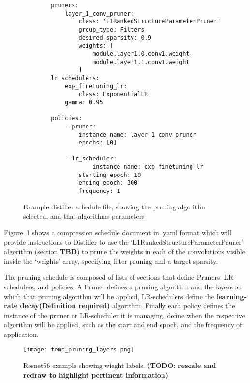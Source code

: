 \documentclass[../Dissertation.tex]{subfiles}
\begin{document}
\singlespacing
\begin{figure}[H]
    \begin{verbatim}
        pruners: 
            layer_1_conv_pruner:
                class: 'L1RankedStructureParameterPruner'
                group_type: Filters
                desired_sparsity: 0.9
                weights: [
                    module.layer1.0.conv1.weight,
                    module.layer1.1.conv1.weight
                ]
        lr_schedulers:
            exp_finetuning_lr:
                class: ExponentialLR
            gamma: 0.95

        policies:
            - pruner:
                instance_name: layer_1_conv_pruner
                epochs: [0]
            
            - lr_scheduler:
                    instance_name: exp_finetuning_lr
                starting_epoch: 10
                ending_epoch: 300
                frequency: 1
    \end{verbatim}
    \caption{Example distiller schedule file, showing the pruning algorithm selected, and that algorithms parameters}
    \label{fig:CompressionSchedule}
\end{figure}
\doublespacing

Figure~\ref{fig:CompressionSchedule} shows a compression schedule document in .yaml format which will provide instructions to Distiller to use the `L1RankedStructureParameterPruner' algorithm (section \textbf{TBD}) to prune the weights in each of the convolutions visible inside the `weights' array, specifying filter pruning and a target sparsity.

The pruning schedule is composed of lists of sections that define Pruners, LR-schedulers, and policies. A Pruner defines a pruning algorithm and the layers on which that pruning algorithm will be applied, LR-schedulers define the \textbf{learning-rate decay(Definition required)} algorithm. 
Finally each policy defines the instance of the pruner or LR-scheduler it is managing, define when the respective algorithm will be applied, such as the start and end epoch, and the frequency of application.

\begin{figure}[H]
    \texttt{[image: temp\_pruning\_layers.png]}
    \caption{Resnet56 example showing wieght labels. \textbf{(TODO: rescale and redraw to highlight pertinent information)}}
    \label{fig:resnet56weightlabels}
\end{figure}
\end{document}
